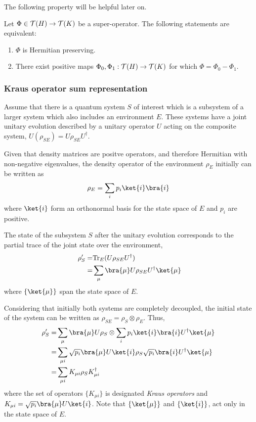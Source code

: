 The following property will be helpful later on.

\begin{theorem} \cite[Theorem 2.25]{watrous2018theory} \label{thm:sub_pos_hem-pres}
  Let \(\Phi \in \mathcal{T}(H) \to \mathcal{T}(K)\) be a super-operator. The following statements are equivalent:
\begin{enumerate}
    \item \(\Phi\) is Hermitian preserving.
    \item There exist positive maps \(\Phi_0, \Phi_1:  \mathcal{T}(H) \to \mathcal{T}(K)\) for which
    \(
        \Phi = \Phi_0 - \Phi_1.
    \)
\end{enumerate}
\end{theorem}




\subsubsection{Kraus operator sum representation}


Assume that there is a quantum system $S$ of interest which is a subsystem of a larger system which also includes an environment $E$. These systems have a joint unitary evolution described by a unitary operator $U$ acting on the composite system, $U (\rho_{SE} )= U \rho_{SE} U^{\dag}$. 

Given that density matrices are positve operators, and therefore Hermitian with non-negative eigenvalues, the density operator of the environment $\rho_E$ initially can be written as 
\begin{equation*}
  \rho_E = \sum_{i} p_{i} \ket{i} \bra{i}
\end{equation*}
where $\ket{i}$ form an orthonormal basis for the state space of $E$ and $p_{i}$ are positive. 

The state of the subsystem $S$ after the unitary evolution corresponds to the partial trace of the joint state over the environment,
\begin{align*}
  \rho_{S}' = & \text{Tr}_{E}(U \rho_{SE} U^{\dag}) \\
 = & \sum_{\mu} \bra{\mu} U \rho_{SE} U^{\dag} \ket{\mu}
\end{align*}
where $\{\ket{\mu}\}$ span the state space of $E$.

 
Considering that initially both systems are completely decoupled, the initial state of the system can be written as $ \rho_{SE} = \rho_{S} \otimes \rho_{E}$. Thus,
\begin{align*} 
  \rho_{S}' = & \sum_{\mu} \bra{\mu} U \rho_{S} \otimes \sum_{i} p_{i} \ket{i} \bra{i} U^{\dag} \ket{\mu} \\
  = & \sum_{\mu i}  \sqrt{p_{i}} \bra{\mu} U \ket{i} \rho_{S} \sqrt{p_{i}} \bra{i} U^{\dag} \ket{\mu}  \\ 
  = & \sum_{\mu i} K_{\mu i} \rho_{S} K_{\mu i}^{\dag}
\end{align*}
where the set of operators $\{K_{\mu i}\}$ is designated \emph{Kraus operators} and $K_{\mu i} = \sqrt{p_{i}} \bra{\mu} U \ket{i}$. Note that $\{\ket{\mu}\}$ and $\{\ket{i}\}$, act only in the state space of $E$. 

